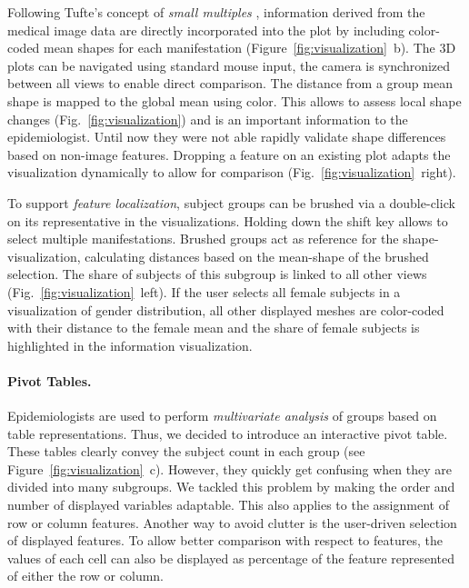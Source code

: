 \documentclass[journal]{style/vgtc} 			          %
\begin{document}
%
%
Following Tufte's concept of \emph{small multiples} \cite{Tufte1983}, information derived from the medical image data are directly incorporated into the plot by including color-coded mean shapes for each manifestation (Figure~\ref{fig:visualization}~b).
%
The 3D plots can be navigated using standard mouse input, the camera is synchronized between all views to enable direct comparison.
%
The distance from a group mean shape is mapped to the global mean using color.
%
This allows to assess local shape changes (Fig.~\ref{fig:visualization}) and is an important information to the epidemiologist.
%
Until now they were not able rapidly validate shape differences based on non-image features.
%
Dropping a feature on an existing plot adapts the visualization dynamically to allow for comparison (Fig.~\ref{fig:visualization}~right).

To support \emph{feature localization}, subject groups can be brushed via a double-click on its representative in the visualizations.
%
Holding down the shift key allows to select multiple manifestations.
%
Brushed groups act as reference for the shape-visualization, calculating distances based on the mean-shape of the brushed selection.
%
The share of subjects of this subgroup is linked to all other views (Fig.~\ref{fig:visualization}~left).
%
If the user selects all female subjects in a visualization of gender distribution, all other displayed meshes are color-coded with their distance to the female mean and the share of female subjects is highlighted in the information visualization.
%

\paragraph{Pivot Tables.}
%
Epidemiologists are used to perform \emph{multivariate analysis} of groups based on table representations.
%
Thus, we decided to introduce an interactive pivot table.
%
These tables clearly convey the subject count in each group (see Figure~\ref{fig:visualization}~c).
%
However, they quickly get confusing when they are divided into many subgroups.
%
We tackled this problem by making the order and number of displayed variables adaptable.
%
This also applies to the assignment of row or column features.
%
Another way to avoid clutter is the user-driven selection of displayed features.
%
To allow better comparison with respect to features, the values of each cell can also be displayed as percentage of the feature represented of either the row or column.
\end{document}
